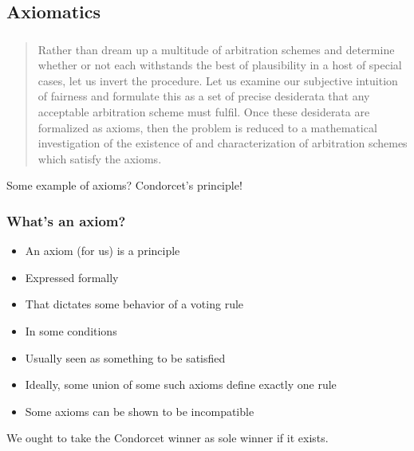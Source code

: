 \documentclass[french,english]{beamer}
\begin{document}
\subsection{Axiomatics}
\begin{frame}
	\frametitle{\subsecname}
	\begin{quote}
		Rather than dream up a multitude of arbitration schemes and determine whether or not each withstands the best of plausibility in a host of special cases, let us invert the procedure. Let us examine our subjective intuition of fairness and formulate this as a set of precise desiderata that any acceptable arbitration scheme must fulfil. Once these desiderata are formalized as axioms, then the problem is reduced to a mathematical investigation of the existence of and characterization of arbitration schemes which satisfy the axioms.
	\end{quote}
	\citet[p. 121]{luce_games_1957}\par
	Some example of axioms? \pause Condorcet’s principle!
\end{frame}

\begin{frame}
	\frametitle{What’s an axiom?}
	\begin{itemize}
		\item An axiom (for us) is a principle
		\item Expressed formally
		\item That dictates some behavior of a voting rule
		\item In some conditions
		\item Usually seen as something to be satisfied
		\item Ideally, some union of some such axioms define exactly one rule
		\item Some axioms can be shown to be incompatible
	\end{itemize}
	\begin{example}
		We ought to take the Condorcet winner as sole winner if it exists.
	\end{example}
\end{frame}
\end{document}

